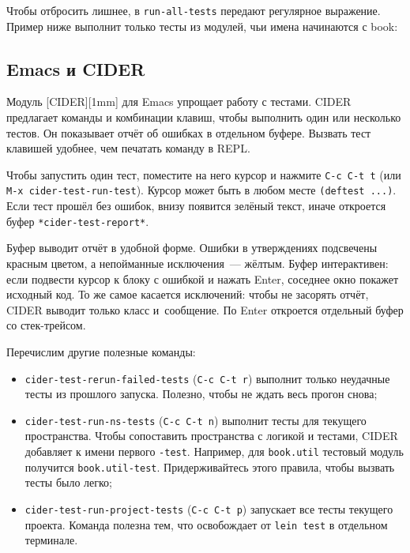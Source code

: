 
Чтобы отбросить лишнее, в \verb|run-all-tests| передают регулярное выражение.
Пример ниже выполнит только тесты из модулей, чьи имена начинаются с book:

\begin{english}
\end{english}

\subsection{Emacs и CIDER}


Модуль [CIDER][1mm] для Emacs упрощает
работу с тестами. CIDER предлагает команды и комбинации клавиш, чтобы выполнить
один или несколько тестов. Он показывает отчёт об ошибках в отдельном
буфере. Вызвать тест клавишей удобнее, чем печатать команду в REPL.

Чтобы запустить один тест, поместите на него курсор и нажмите \verb|C-c C-t t|
(или \verb|M-x cider-test-run-test|). Курсор может быть в любом месте
\verb|(deftest ...)|. Если тест прошёл без ошибок, внизу появится зелёный
текст, иначе откроется буфер \verb|*cider-test-report*|.

Буфер выводит отчёт в удобной форме. Ошибки в утверждениях подсвечены красным
цветом, а непойманные исключения~--- жёлтым. Буфер интерактивен: если подвести
курсор к блоку с ошибкой и нажать Enter, соседнее окно покажет исходный код. То
же самое касается исключений: чтобы не засорять отчёт, CIDER выводит только
класс и~сообщение. По Enter откроется отдельный буфер со стек-трейсом.

Перечислим другие полезные команды:

\begin{itemize}

\item
  \verb|cider-test-rerun-failed-tests| (\verb|C-c C-t r|) выполнит только
  неудачные тесты из прошлого запуска. Полезно, чтобы не ждать весь прогон
  снова;

\item
  \verb|cider-test-run-ns-tests| (\verb|C-c C-t n|) выполнит тесты для текущего
  пространства. Чтобы сопоставить пространства с логикой и тестами, CIDER
  добавляет к имени первого \verb|-test|. Например, для \verb|book.util|
  тестовый модуль получится \verb|book.util-test|. Придерживайтесь этого
  правила, чтобы вызвать тесты было легко;

\item
  \verb|cider-test-run-project-tests| (\verb|C-c C-t p|) запускает все тесты
  текущего проекта. Команда полезна тем, что освобождает от \verb|lein test| в
  отдельном терминале.

\end{itemize}

